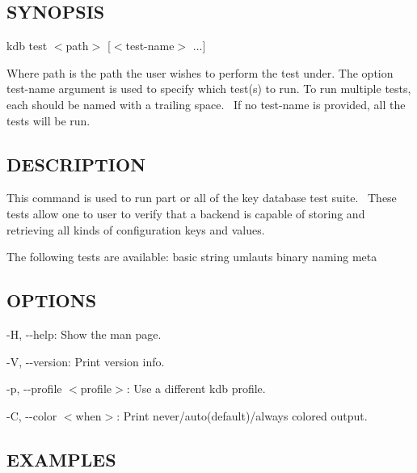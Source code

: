 \subsection*{S\+Y\+N\+O\+P\+S\+IS}

{\ttfamily kdb test $<$path$>$ \mbox{[}$<$test-\/name$>$ ...\mbox{]}}~\newline


Where {\ttfamily path} is the path the user wishes to perform the test under. The option {\ttfamily test-\/name} argument is used to specify which test(s) to run. To run multiple tests, each should be named with a trailing space.~\newline
 If no {\ttfamily test-\/name} is provided, all the tests will be run.~\newline


\subsection*{D\+E\+S\+C\+R\+I\+P\+T\+I\+ON}

This command is used to run part or all of the key database test suite.~\newline
 These tests allow one to user to verify that a backend is capable of storing and retrieving all kinds of configuration keys and values.~\newline


The following tests are available\+: basic string umlauts binary naming meta~\newline


\subsection*{O\+P\+T\+I\+O\+NS}


\begin{DoxyItemize}
\item {\ttfamily -\/H}, {\ttfamily -\/-\/help}\+: Show the man page.
\item {\ttfamily -\/V}, {\ttfamily -\/-\/version}\+: Print version info.
\item {\ttfamily -\/p}, {\ttfamily -\/-\/profile $<$profile$>$}\+: Use a different kdb profile.
\item {\ttfamily -\/C}, {\ttfamily -\/-\/color $<$when$>$}\+: Print never/auto(default)/always colored output.
\end{DoxyItemize}

\subsection*{E\+X\+A\+M\+P\+L\+ES}

